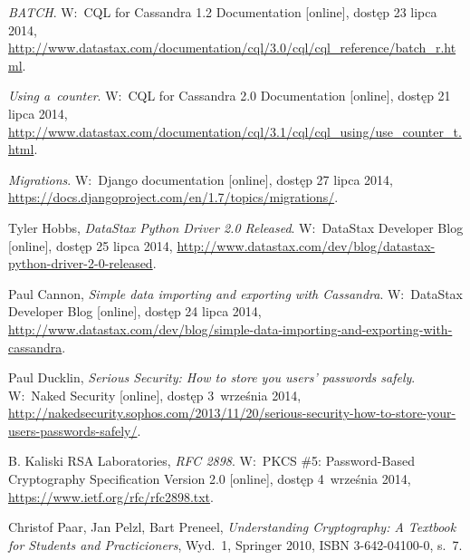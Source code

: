 \begin{thebibliography}{9}
\emph{BATCH}. W:~CQL for Cassandra 1.2 Documentation [online], dostęp 23 lipca 2014, \url{http://www.datastax.com/documentation/cql/3.0/cql/cql_reference/batch_r.html}.

\emph{Using a~counter}. W:~CQL for Cassandra 2.0 Documentation [online], dostęp 21 lipca 2014, \url{http://www.datastax.com/documentation/cql/3.1/cql/cql_using/use_counter_t.html}.

\emph{Migrations}. W:~Django documentation [online], dostęp 27 lipca 2014, \url{https://docs.djangoproject.com/en/1.7/topics/migrations/}.

Tyler Hobbs, \emph{DataStax Python Driver 2.0 Released}. W:~DataStax Developer Blog [online], dostęp 25 lipca 2014, \url{http://www.datastax.com/dev/blog/datastax-python-driver-2-0-released}.

Paul Cannon, \emph{Simple data importing and exporting with Cassandra}. W:~DataStax Developer Blog [online], dostęp 24 lipca 2014, \url{http://www.datastax.com/dev/blog/simple-data-importing-and-exporting-with-cassandra}.

Paul Ducklin, \emph{Serious Security: How to store you users' passwords safely}. W:~Naked Security [online], dostęp 3~września 2014, \url{http://nakedsecurity.sophos.com/2013/11/20/serious-security-how-to-store-your-users-passwords-safely/}.

B. Kaliski RSA Laboratories, \emph{RFC 2898}. W:~PKCS \#5: Password-Based Cryptography Specification Version 2.0 [online], dostęp 4~września 2014, \url{https://www.ietf.org/rfc/rfc2898.txt}.

Christof Paar, Jan Pelzl, Bart Preneel, \emph{Understanding Cryptography: A Textbook for Students and Practicioners}, Wyd.~1, Springer 2010, ISBN 3-642-04100-0, s.~7.

\end{thebibliography}
